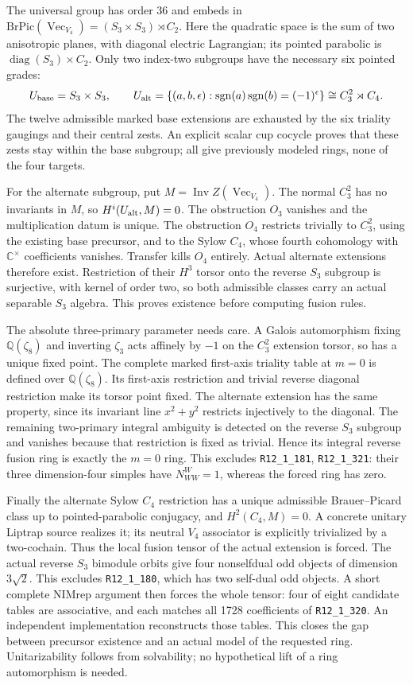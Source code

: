 \documentclass[11pt]{article}
\newcommand{\R}[1]{\texttt{R12\_1\_#1}}
\renewcommand{\Vec}{\operatorname{Vec}}
\newcommand{\C}{\mathbb C}
\newcommand{\Q}{\mathbb Q}
\begin{document}
The universal group has order 36 and embeds in
$\mathrm{BrPic}(\Vec_{V_4})=(S_3\times S_3)\rtimes C_2$.
Here the quadratic space is the sum of two anisotropic planes, with
diagonal electric Lagrangian; its pointed parabolic is
$\operatorname{diag}(S_3)\times C_2$.
Only two index-two subgroups have the necessary six pointed grades:
\[
 U_{\rm base}=S_3\times S_3,\qquad
 U_{\rm alt}=\{(a,b,\epsilon):\operatorname{sgn}(a)
 \operatorname{sgn}(b)=(-1)^\epsilon\}\cong C_3^2\rtimes C_4.
\]
The twelve admissible marked base extensions are exhausted by the six
triality gaugings and their central zests. An explicit scalar cup cocycle
proves that these zests stay within the base subgroup; all give previously
modeled rings, none of the four targets.

For the alternate subgroup, put $M=\operatorname{Inv}Z(\Vec_{V_4})$.
The normal $C_3^2$ has no invariants in $M$, so $H^i(U_{\rm alt},M)=0$.
The obstruction $O_3$ vanishes and the multiplication datum is unique.
The obstruction $O_4$ restricts trivially to $C_3^2$, using the existing
base precursor, and to the Sylow $C_4$, whose fourth cohomology with
$\C^\times$ coefficients vanishes. Transfer kills $O_4$ entirely.
Actual alternate extensions therefore exist. Restriction of their
$H^3$ torsor onto the reverse $S_3$ subgroup is surjective, with kernel
of order two, so both admissible classes carry an actual separable
$S_3$ algebra. This proves existence before computing fusion rules.

The absolute three-primary parameter needs care. A Galois automorphism
fixing $\Q(\zeta_8)$ and inverting $\zeta_3$ acts affinely by $-1$ on
the $C_3^2$ extension torsor, so has a unique fixed point. The complete
marked first-axis triality table at $m=0$ is defined over $\Q(\zeta_8)$.
Its first-axis restriction and trivial reverse diagonal restriction make
its torsor point fixed. The alternate extension has the same property,
since its invariant line $x^2+y^2$ restricts injectively to the diagonal.
The remaining two-primary integral ambiguity is detected on the reverse
$S_3$ subgroup and vanishes because that restriction is fixed as trivial.
Hence its integral reverse fusion ring is exactly the $m=0$ ring.
This excludes \R{181}, \R{321}: their three dimension-four simples
have $N_{WW}^{W}=1$, whereas the forced ring has zero.

Finally the alternate Sylow $C_4$ restriction has a unique admissible
Brauer--Picard class up to pointed-parabolic conjugacy, and $H^2(C_4,M)=0$.
A concrete unitary Liptrap
source realizes it; its neutral $V_4$ associator is explicitly trivialized
by a two-cochain. Thus the local fusion tensor of the actual extension is
forced. The actual reverse $S_3$ bimodule orbits give four nonselfdual odd
objects of dimension $3\sqrt2$. This excludes \R{180}, which has two
self-dual odd objects. A short complete NIMrep argument then forces the
whole tensor: four of eight candidate tables are associative, and each
matches all 1728 coefficients of \R{320}. An independent implementation
reconstructs those tables. This closes the gap between precursor existence
and an actual model of the requested ring. Unitarizability follows from
solvability; no hypothetical lift of a ring automorphism is needed.
\end{document}
